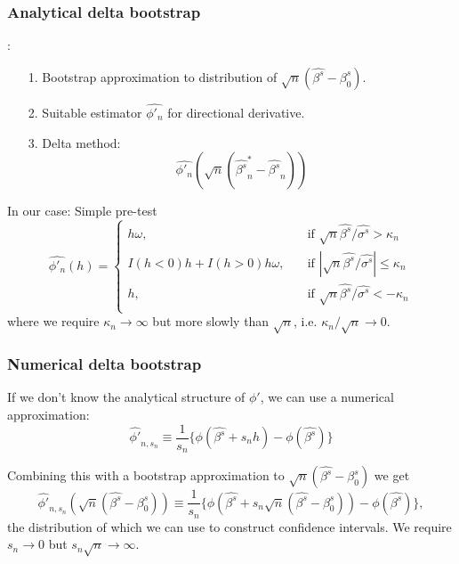 \documentclass[11pt, aspectratio=169]{beamer}
\begin{document}
\begin{frame}
    \frametitle{Analytical delta bootstrap}:
    \begin{itemize}
        \item[1.] Bootstrap approximation to distribution of $\sqrt{n}(\hat{\beta^s} - \beta_0^s)$.
        \item[2.] Suitable estimator $\hat{\phi'_n}$ for directional derivative.
        \item[3.] Delta method:
        \begin{equation*}
            \hat{\phi'_n}(\sqrt{n}(\hat{\beta^s}^*_n - \hat{\beta^s}_n))
        \end{equation*}
    \end{itemize}

    In our case: Simple pre-test
    \begin{equation*}
        \hat{\phi'_n}(h)=
        \begin{cases}
            h  \omega,& \quad \text{if } \sqrt{n}\hat{\beta^s}/\hat{\sigma^s} > \kappa_n\\
            I(h < 0)  h + I(h > 0)  h  \omega,& \quad \text{if } |\sqrt{n}\hat{\beta^s}/\hat{\sigma^s}| \leq \kappa_n\\
            h,& \quad \text{if } \sqrt{n}\hat{\beta^s}/\hat{\sigma^s} < -\kappa_n\\
        \end{cases}
    \end{equation*}
    where we require $\kappa_n \to \infty$ but more slowly than $\sqrt{n}$, i.e. $\kappa_n / \sqrt{n} \to 0$.
\end{frame}

\begin{frame}
    \frametitle{Numerical delta bootstrap}

    If we don't know the analytical structure of $\phi'$, we can use a numerical approximation:
    \begin{equation*}
        \hat{\phi'}_{n, s_n} \equiv \frac{1}{s_n}\{\phi(\hat{\beta^s} + s_n h) - \phi(\hat{\beta^s})\}
    \end{equation*}

    Combining this with a bootstrap approximation to $\sqrt{n}(\hat{\beta^s} - \beta_0^s)$ we get
    \begin{equation*}
        \hat{\phi'}_{n, s_n}(\sqrt{n}(\hat{\beta^s} - \beta_0^s)) \equiv \frac{1}{s_n}\{\phi(\hat{\beta^s} + s_n \sqrt{n}(\hat{\beta^s} - \beta_0^s)) - \phi(\hat{\beta^s})\},
    \end{equation*}
    the distribution of which we can use to construct confidence intervals.
    We require $s_n\to0$ but $s_n\sqrt{n} \to \infty$.
\end{frame}
\end{document}
